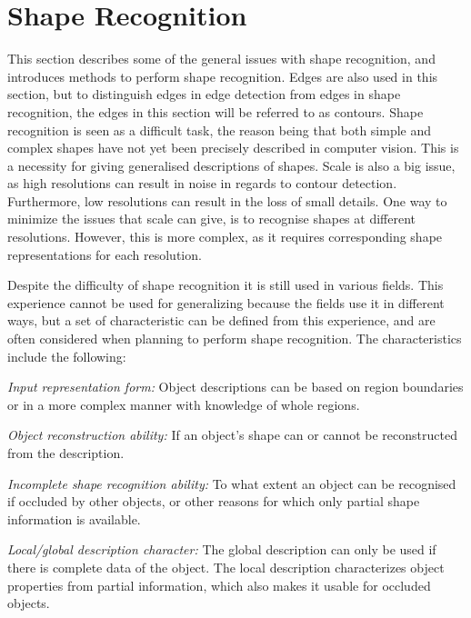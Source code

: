 \section{Shape Recognition}
This section describes some of the general issues with shape recognition, and introduces methods to perform shape recognition. Edges are also used in this section, but to distinguish edges in edge detection from edges in shape recognition, the edges in this section will be referred to as contours.
Shape recognition is seen as a difficult task, the reason being that both simple and complex shapes have not yet been precisely described in computer vision. This is a necessity for giving generalised descriptions of shapes\citep[page 328-329]{obj_recogn_book}.
Scale is also a big issue, as high resolutions can result in noise in regards to contour detection.
Furthermore, low resolutions can result in the loss of small details. One way to minimize the issues that scale can give, is to recognise shapes at different resolutions. However, this is more complex, as it requires corresponding shape representations for each resolution.

Despite the difficulty of shape recognition it is still used in various fields. This experience cannot be used for generalizing because the fields use it in different ways, but a set of characteristic can be defined from this experience, and are often considered when planning to perform shape recognition. The characteristics include the following:

	\textit{Input representation form:} Object descriptions can be based on region boundaries or in a more complex manner with knowledge of whole regions.

	\textit{Object reconstruction ability:} If an object's shape can or cannot be reconstructed from the description.

	\textit{Incomplete shape recognition ability:} To what extent an object can be recognised if occluded by other objects, or other reasons for which only partial shape information is available.

	\textit{Local/global description character:} The global description can only be used if there is complete data of the object. The local description characterizes object properties from partial information, which also makes it usable for occluded objects.

